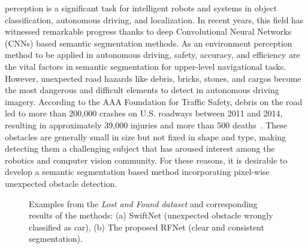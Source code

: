 \documentclass[letterpaper, 10 pt, journal, twoside]{ieeetran}
\begin{document}
 perception is a significant task for intelligent robots and systems in object classification, autonomous driving, and localization.
In recent years, this field has witnessed remarkable progress thanks to deep Convolutional Neural Networks (CNNs) based semantic segmentation methods\cite{long2015fully}\cite{chen2017deeplab}\cite{chen2018encoder}. As an environment perception method to be applied in autonomous driving, safety, accuracy, and efficiency are the vital factors in semantic segmentation for upper-level navigational tasks.
However, unexpected road hazards like debris, bricks, stones, and cargos become the most dangerous and difficult elements to detect in autonomous driving imagery. 
According to the AAA Foundation for Traffic Safety, debris on the road led to more than 200,000 crashes on U.S. roadways between 2011 and 2014, resulting in approximately 39,000 injuries and more than 500 deaths~\cite{roaddebris}.
These obstacles are generally small in size but not fixed in shape and type, making detecting them a challenging subject that has aroused interest among the robotics and computer vision community. For these reasons, it is desirable to develop a semantic segmentation based method incorporating pixel-wise unexpected obstacle detection.


\begin{figure}
    \centering
    \caption{Examples from the \textit{Lost and Found dataset} and corresponding results of the methods: (a) SwiftNet (unexpected obstacle wrongly classified as car), (b) The proposed RFNet (clear and consistent segmentation).} 
    \label{fig:1}
    
\end{figure}
\end{document}
